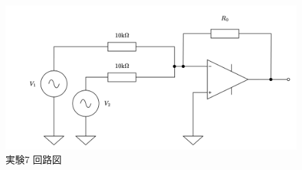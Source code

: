 \begin{figure}[!htb]
	\centering
	\includegraphics[width=0.7\linewidth]{src/figures/exp7/circuit.png}
	\caption{実験7 回路図}\label{fig:exp7-circuit}
\end{figure}
